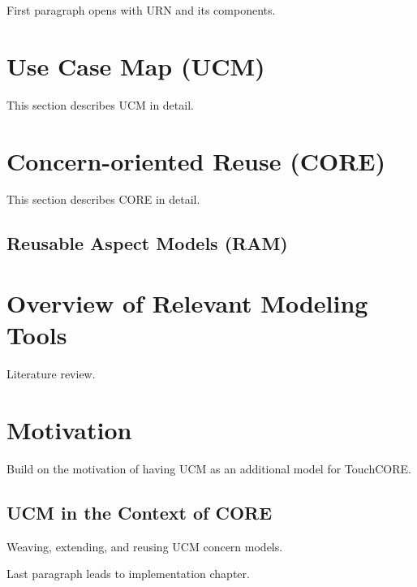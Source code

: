 First paragraph opens with URN and its components.

\section{Use Case Map (UCM)}

This section describes UCM in detail.

\section{Concern-oriented Reuse (CORE)}

This section describes CORE in detail.

\subsection{Reusable Aspect Models (RAM)}

\section{Overview of Relevant Modeling Tools}

Literature review.

\section{Motivation}

Build on the motivation of having UCM as an additional model for TouchCORE.

\subsection{UCM in the Context of CORE}

Weaving, extending, and reusing UCM concern models.

Last paragraph leads to implementation chapter.
